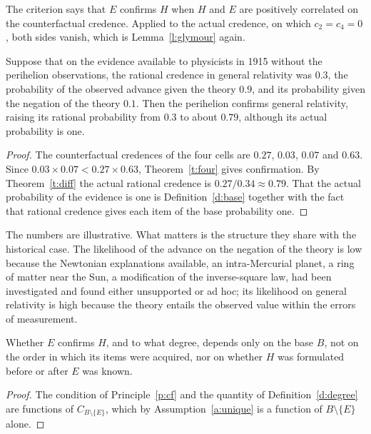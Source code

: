 \documentclass{situationist-preprint}
\begin{document}
The criterion says that $E$ confirms $H$ when $H$ and $E$ are positively correlated on the counterfactual credence. Applied to the actual credence, on which $c_2 = c_4 = 0$, both sides vanish, which is Lemma~\ref{l:glymour} again.

\begin{proposition}[Mercury]\label{p:mercury}
Suppose that on the evidence available to physicists in 1915 without the perihelion observations, the rational credence in general relativity was $0.3$, the probability of the observed advance given the theory $0.9$, and its probability given the negation of the theory $0.1$. Then the perihelion confirms general relativity, raising its rational probability from $0.3$ to about $0.79$, although its actual probability is one.
\end{proposition}

\begin{proof}
The counterfactual credences of the four cells are $0.27$, $0.03$, $0.07$ and $0.63$. Since $0.03 \times 0.07 < 0.27 \times 0.63$, Theorem~\ref{t:four} gives confirmation. By Theorem~\ref{t:diff} the actual rational credence is $0.27/0.34 \approx 0.79$. That the actual probability of the evidence is one is Definition~\ref{d:base} together with the fact that rational credence gives each item of the base probability one.
\end{proof}

The numbers are illustrative. What matters is the structure they share with the historical case. The likelihood of the advance on the negation of the theory is low because the Newtonian explanations available, an intra-Mercurial planet, a ring of matter near the Sun, a modification of the inverse-square law, had been investigated and found either unsupported or ad hoc; its likelihood on general relativity is high because the theory entails the observed value within the errors of measurement.

\begin{proposition}\label{p:order}
Whether $E$ confirms $H$, and to what degree, depends only on the base $B$, not on the order in which its items were acquired, nor on whether $H$ was formulated before or after $E$ was known.
\end{proposition}

\begin{proof}
The condition of Principle~\ref{p:cf} and the quantity of Definition~\ref{d:degree} are functions of $C_{B \setminus \{E\}}$, which by Assumption~\ref{a:unique} is a function of $B \setminus \{E\}$ alone.
\end{proof}
\end{document}

